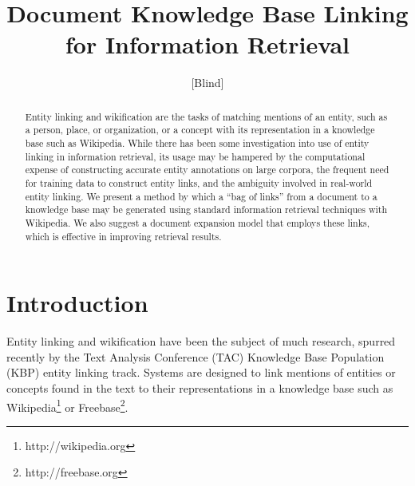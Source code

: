 \documentclass{sig-alternate}
\begin{document}

\author{[Blind]}

\title{Document Knowledge Base Linking for Information Retrieval}

\maketitle
\begin{abstract}
Entity linking and wikification are the tasks of matching mentions of an entity, such as a person, place, or organization, or a concept with its representation in a knowledge base such as Wikipedia. While there has been some investigation into use of entity linking in information retrieval, its usage may be hampered by the computational expense of constructing accurate entity annotations on large corpora, the frequent need for training data to construct entity links, and the ambiguity involved in real-world entity linking. We present a method by which a ``bag of links'' from a document to a knowledge base may be generated using standard information retrieval techniques with Wikipedia. We also suggest a document expansion model that employs these links, which is effective in improving retrieval results.
\end{abstract}



\section{Introduction}\label{section.intro}

Entity linking and wikification have been the subject of much research, spurred recently by the Text Analysis Conference (TAC) Knowledge Base Population (KBP) entity linking track. Systems are designed to link mentions of entities or concepts found in the text to their representations in a knowledge base such as Wikipedia\footnote{http://wikipedia.org} or Freebase\footnote{http://freebase.org}.
\end{document}
